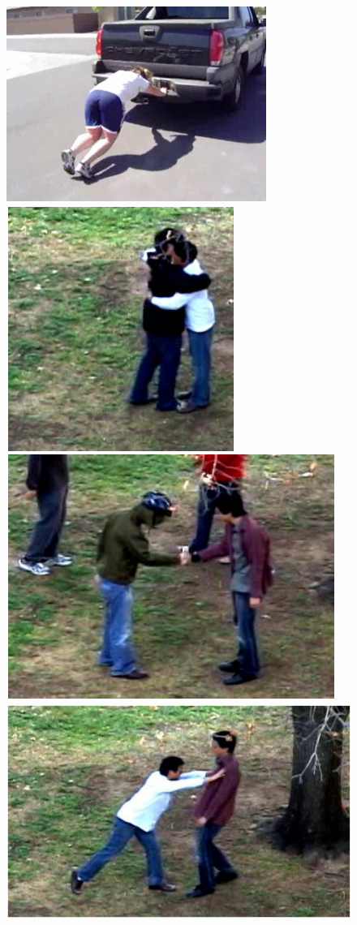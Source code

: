 \documentclass[10pt,twocolumn,letterpaper]{article}
\begin{document}
\begin{figure}[!t]
\begin{center}
\includegraphics[scale=0.20]{figures/dataset_thumb/hmdb/class6.png} \\
\includegraphics[scale=0.3]{figures/dataset_thumb/uti/crop_class1.pdf} 
\includegraphics[scale=0.3]{figures/dataset_thumb/uti/crop_class2.pdf} 
\includegraphics[scale=0.3]{figures/dataset_thumb/uti/crop_class3.pdf} 

\end{center}
\end{figure}
\end{document}
